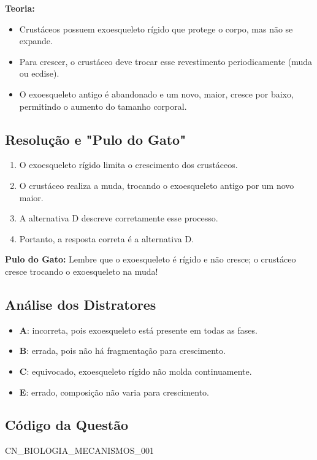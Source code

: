 \documentclass{article}
\begin{document}
\textbf{Teoria:}
\begin{itemize}
  \item Crustáceos possuem exoesqueleto rígido que protege o corpo, mas não se expande.
  \item Para crescer, o crustáceo deve trocar esse revestimento periodicamente (muda ou ecdise).
  \item O exoesqueleto antigo é abandonado e um novo, maior, cresce por baixo, permitindo o aumento do tamanho corporal.
\end{itemize}

\subsection*{Resolução e "Pulo do Gato"}
\begin{enumerate}
  \item O exoesqueleto rígido limita o crescimento dos crustáceos.
  \item O crustáceo realiza a muda, trocando o exoesqueleto antigo por um novo maior.
  \item A alternativa D descreve corretamente esse processo.
  \item Portanto, a resposta correta é a alternativa D.
\end{enumerate}

\textbf{Pulo do Gato:} Lembre que o exoesqueleto é rígido e não cresce; o crustáceo cresce trocando o exoesqueleto na muda!

\subsection*{Análise dos Distratores}
\begin{itemize}
  \item \textbf{A}: incorreta, pois exoesqueleto está presente em todas as fases.
  \item \textbf{B}: errada, pois não há fragmentação para crescimento.
  \item \textbf{C}: equivocado, exoesqueleto rígido não molda continuamente.
  \item \textbf{E}: errado, composição não varia para crescimento.
\end{itemize}

\subsection*{Código da Questão}
CN_BIOLOGIA_MECANISMOS_001

\end{document}
